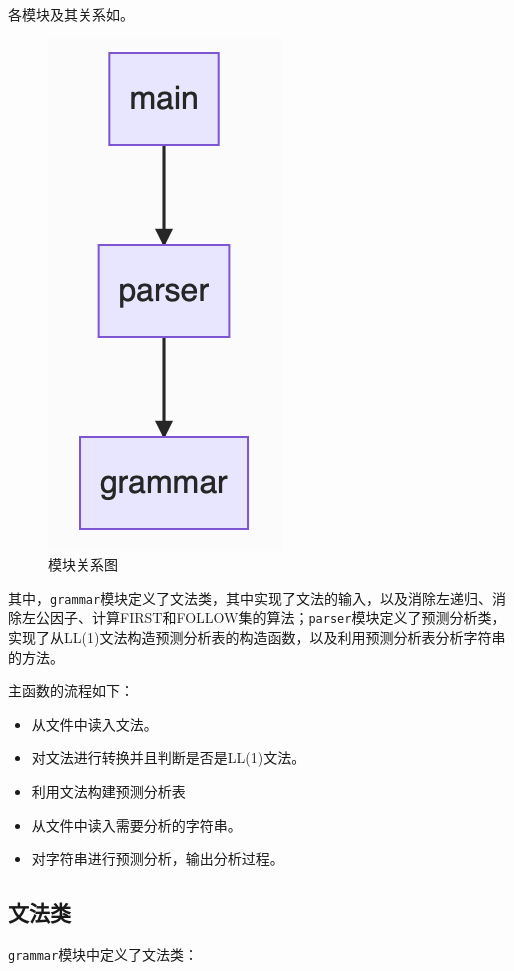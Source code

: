 \documentclass[lang=cn,11pt,a4paper,cite=authornum]{paper}
\begin{document}
各模块及其关系如。

\begin{figure}[htbp]

    \centering
    \includegraphics[width=0.15\linewidth]{./images/structure.png}
    \caption{模块关系图\label{fig:structure}}

\end{figure}

其中，\texttt{grammar}模块定义了文法类，其中实现了文法的输入，以及消除左递归、消除左公因子、计算FIRST和FOLLOW集的算法；\texttt{parser}模块定义了预测分析类，实现了从LL(1)文法构造预测分析表的构造函数，以及利用预测分析表分析字符串的方法。

主函数的流程如下：

\begin{itemize}
    \item 从文件中读入文法。
    \item 对文法进行转换并且判断是否是LL(1)文法。
    \item 利用文法构建预测分析表
    \item 从文件中读入需要分析的字符串。
    \item 对字符串进行预测分析，输出分析过程。
\end{itemize}

\subsection{文法类}

\texttt{grammar}模块中定义了文法类：
\end{document}

